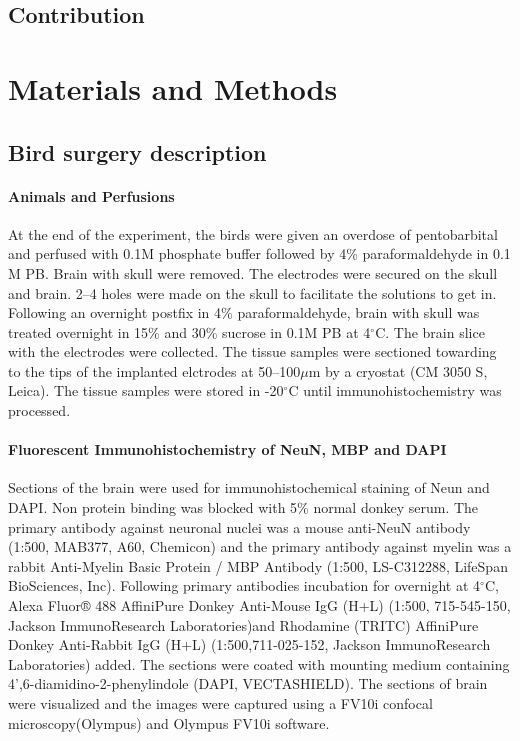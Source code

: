 \documentclass[10pt,letterpaper]{article}
\renewcommand{\subsubsection}[1]{\paragraph{#1}}
\begin{document}
\subsection{Contribution}



\section{Materials and Methods}

\subsection{Bird surgery description}

\subsubsection{Animals and Perfusions}

At the end of the experiment, the birds were given an overdose of pentobarbital and perfused with 0.1M phosphate buffer followed by 4\% paraformaldehyde in 0.1 M PB.
Brain with skull were removed. The electrodes were secured on the skull and brain. 2--4 holes were made on the skull to facilitate the solutions to get in. Following an overnight postfix in 4\% paraformaldehyde, brain with skull was treated overnight in 15\% and 30\% sucrose in 0.1M PB at 4$^\circ$C.  The brain slice with the electrodes were collected. The tissue samples were sectioned towarding to the tips of the implanted elctrodes at 50--100$\mu$m by a cryostat (CM 3050 S, Leica). The tissue samples were stored in -20$^\circ$C until immunohistochemistry was processed.

\subsubsection{Fluorescent Immunohistochemistry of NeuN, MBP and DAPI}

Sections of the brain were used for immunohistochemical staining of Neun and DAPI. Non protein binding was blocked with 5\% normal donkey serum. The primary antibody against neuronal nuclei was a mouse anti-NeuN antibody (1:500, MAB377, A60, Chemicon) and the primary antibody against myelin was a rabbit Anti-Myelin Basic Protein / MBP Antibody (1:500, LS-C312288, LifeSpan BioSciences, Inc). Following primary antibodies incubation for overnight at 4$^\circ$C, Alexa Fluor® 488 AffiniPure Donkey Anti-Mouse IgG (H+L) (1:500, 715-545-150, Jackson ImmunoResearch Laboratories)and Rhodamine (TRITC) AffiniPure Donkey Anti-Rabbit IgG (H+L) (1:500,711-025-152, Jackson ImmunoResearch Laboratories) added. The sections were coated with mounting medium containing 4',6-diamidino-2-phenylindole (DAPI, VECTASHIELD).  The sections of brain were visualized and the images were captured using a FV10i confocal microscopy(Olympus) and Olympus FV10i software.
\end{document}
